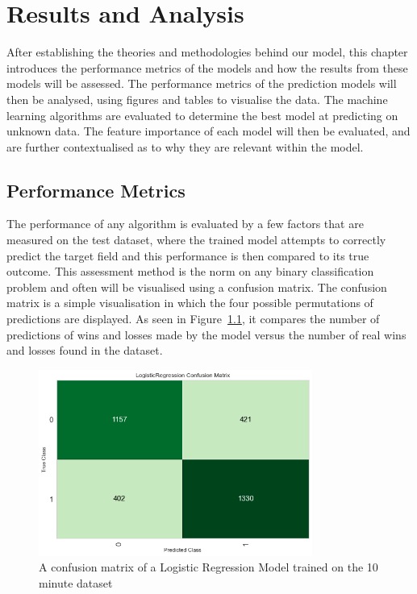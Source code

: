 \chapter{Results and Analysis}\label{ch:resultsandanalysis}

After establishing the theories and methodologies behind our model, this chapter introduces the performance metrics of the models and how the results from these models will be assessed.
The performance metrics of the prediction models will then be analysed, using figures and tables to visualise the data.
The machine learning algorithms are evaluated to determine the best model at predicting on unknown data.
The feature importance of each model will then be evaluated, and are further contextualised as to why they are relevant within the model.

\section{Performance Metrics}\label{sec:Performance Metrics}

The performance of any algorithm is evaluated by a few factors that are measured on the test dataset, where the trained model attempts to correctly predict the target field and this performance is then compared to its true outcome.
This assessment method is the norm on any binary classification problem and often will be visualised using a confusion matrix.
The confusion matrix is a simple visualisation in which the four possible permutations of predictions are displayed.
As seen in Figure~\ref{fig:ConfusionMatrix10}, it compares the number of predictions of wins and losses made by the model versus the number of real wins and losses found in the dataset. \\

\begin{figure}[h]
    \centering
    \includegraphics[width=0.8\textwidth]{figures/ConfusionMatrix10}
    \caption{A confusion matrix of a Logistic Regression Model trained on the 10 minute dataset}
    \label{fig:ConfusionMatrix10}
\end{figure}

